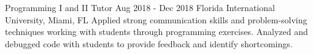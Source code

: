 \documentclass[letterpaper,10pt]{article}
\begin{document}
  \jobHeading
    {Programming I and II Tutor}
    {Aug 2018 - Dec 2018}
    {Florida International University, Miami, FL}
  \listStart
    \bulletItem
    {Applied strong communication skills and problem-solving techniques working with students through programming exercises.}
    \bulletItem
    {Analyzed and debugged code with students to provide feedback and identify shortcomings.}
  \listEnd

\sectionEnd

\end{document}
